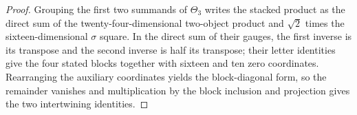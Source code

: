 \begin{proof}
    \leanok
    Grouping the first two summands of $\Theta_3$ writes the stacked
    product as the direct sum of the twenty-four-dimensional two-object
    product and $\sqrt2$ times the sixteen-dimensional $\sigma$ square.
    In the direct sum of their gauges, the first inverse is its transpose
    and the second inverse is half its transpose; their letter identities
    give the four stated blocks together with sixteen and ten zero
    coordinates. Rearranging the auxiliary coordinates yields the
    block-diagonal form, so the remainder vanishes and multiplication by
    the block inclusion and projection gives the two intertwining
    identities.
\end{proof}
